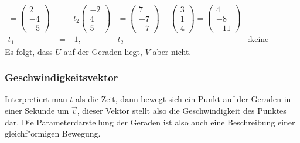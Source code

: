 \begin{beispiel}
\begin{align*}
=
\begin{pmatrix}2\\-4\\-5 \end{pmatrix}
&
\qquad
t_2
\begin{pmatrix}-2\\4\\5\end{pmatrix}
&=
\begin{pmatrix}7\\-7\\-7\end{pmatrix}
-
\begin{pmatrix}3\\1\\4 \end{pmatrix}
=
\begin{pmatrix}4\\-8\\-11\end{pmatrix}
\\
t_1&=-1,&t_2&:\text{keine L"osung.}
\end{align*}
Es folgt, dass $U$ auf der Geraden liegt, $V$ aber nicht.
\end{beispiel}

\subsubsection{Geschwindigkeitsvektor}
Interpretiert man $t$ als die Zeit, dann bewegt sich ein Punkt auf der Geraden in
einer Sekunde um $\vec v$, dieser Vektor stellt also die Geschwindigkeit
des Punktes dar.
Die Parameterdarstellung der Geraden ist also auch eine
Beschreibung einer gleichf"ormigen Bewegung.

